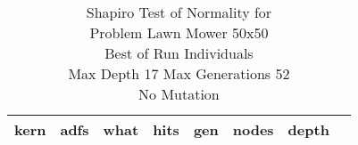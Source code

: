 \begin{table}[H]
\caption{Shapiro Test of Normality for \\ Problem  Lawn Mower 50x50\\Best of Run Individuals \\ Max Depth 17 Max Generations 52\\ No Mutation \\}
\begin{center}
\scalebox{0.8} %
{
\begin{tabular}{lrrrrrrr}
\hline
kern & adfs & what & hits & gen & nodes & depth \\
\hline


\end{tabular}
}
\end{center}
\end{table}

